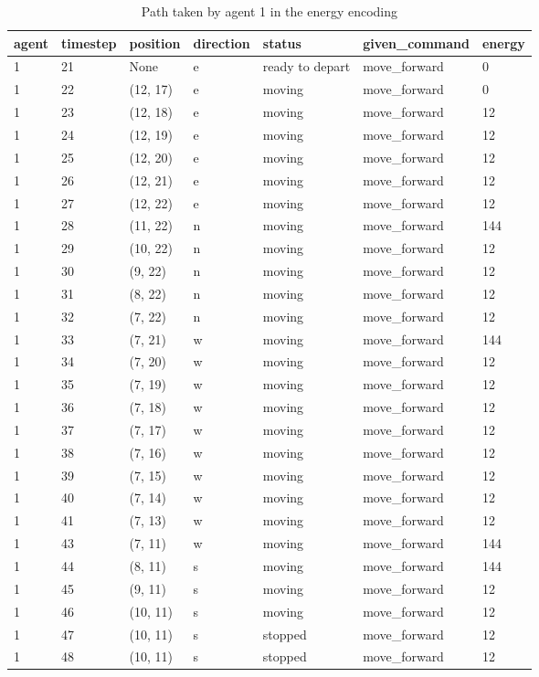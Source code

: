 \documentclass[12pt, a4paper]{llncs}
\begin{document}
\begin{table}[htbp]
  \centering
  \caption{Path taken by agent 1 in the energy encoding}
  \label{tab:energy1}
  \begin{tabular}{lllllll}
    \toprule
    agent & timestep & position & direction & status & given\_command & energy \\
    \midrule
1 & 21 & None & e & ready to depart & move\_forward & 0 \\
1 & 22 & (12, 17) & e	 & moving & move\_forward & 0 \\
1 & 23 & (12, 18) & e & moving & move\_forward & 12 \\
1 & 24 & (12, 19) & e & moving & move\_forward & 12 \\
1 & 25 & (12, 20) & e & moving & move\_forward & 12 \\
1 & 26 & (12, 21) & e & moving & move\_forward & 12 \\
1 & 27 & (12, 22) & e & moving & move\_forward & 12 \\
1 & 28 & (11, 22) & n & moving & move\_forward & 144 \\
1 & 29 & (10, 22) & n & moving & move\_forward & 12 \\
1 & 30 & (9, 22)	 & n & moving & move\_forward & 12 \\
1 & 31 & (8, 22)	 & n & moving & move\_forward & 12 \\
1 & 32 & (7, 22)	 & n & moving & move\_forward & 12 \\
1 & 33 & (7, 21)	 & w & moving & move\_forward & 144 \\
1 & 34 & (7, 20)	 & w & moving & move\_forward & 12 \\
1 & 35 & (7, 19)	 & w & moving & move\_forward & 12 \\
1 & 36 & (7, 18)	 & w & moving & move\_forward & 12 \\
1 & 37 & (7, 17)	 & w & moving & move\_forward & 12 \\
1 & 38 & (7, 16)	 & w & moving & move\_forward & 12 \\
1 & 39 & (7, 15)	 & w & moving & move\_forward & 12 \\
1 & 40 & (7, 14)	 & w & moving & move\_forward & 12 \\
1 & 41 & (7, 13)	 & w & moving & move\_forward & 12 \\
1 & 43 & (7, 11)	 & w & moving & move\_forward & 144 \\
1 & 44 & (8, 11)	 & s & moving & move\_forward	 & 144 \\
1 & 45 & (9, 11)	 & s & moving & move\_forward	 & 12 \\
1 & 46 & (10, 11) & s & moving & move\_forward & 12 \\
1 & 47 & (10, 11) & s & stopped & move\_forward & 12 \\
1 & 48 & (10, 11) & s & stopped & move\_forward & 12 \\
    \bottomrule
  \end{tabular}
\end{table}
\end{document}
